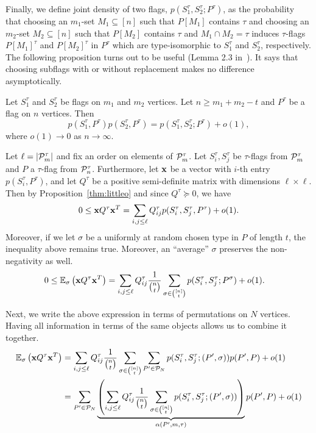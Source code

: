 Finally, we define joint density of two flags, $p(S_1^{\tau}, S_2^{\tau}; P^{\tau})$, as the probability that choosing an $m_1$-set $M_1 \subseteq [n]$ such that $P[M_1]$ contains $\tau$ and choosing an $m_2$-set $M_2 \subseteq [n]$ such that $P[M_2]$ contains $\tau$ and $M_1 \cap M_2 = \tau$ induces $\tau$-flags $P[M_1]^{\tau}$ and $P[M_2]^{\tau}$ in $P^\tau$ which are type-isomorphic to $S_1^{\tau}$ and $S_2^{\tau}$, respectively. The following proposition turns out to be useful (Lemma 2.3 in~\cite{razborov2007original}). It says that choosing subflags with or without replacement makes no difference asymptotically.

\begin{proposition}
Let $S_1^{\tau}$ and $S_2^{\tau}$ be flags on $m_1$ and $m_2$ vertices. Let $n \geq m_1 + m_2 - t$ and $P^{\tau}$ be a flag on $n$ vertices. Then
$$p(S_1^{\tau},P^{\tau})p(S_2^{\tau},P^{\tau}) = p(S_1^{\tau},S_2^{\tau}; P^{\tau}) + o(1),$$
where $o(1) \to 0$ as $n \to \infty$.
\label{thm:littleo}
\end{proposition}

Let $\ell = |\P_m^\tau|$ and fix an order on elements of $\P_m^\tau$. Let $S^\tau_i,S^\tau_j$ be $\tau$-flags from $\P_m^\tau$ and $P$ a $\tau$-flag from $\P_n^\tau$. Furthermore, let $\x$ be a vector with $i$-th entry $p(S_i^{\tau}, P^{\tau})$, and let $Q^\tau$ be a positive semi-definite matrix with dimensions $\ell \times \ell$. Then by Proposition~\ref{thm:littleo} and since $Q^\tau \succeq 0$, we have
$$ 0 \leq \x Q^\tau \x^T = \sum_{i,j \leq \ell} Q^\tau_{ij}p(S_i^{\tau},S_j^{\tau},P^{\tau}) + o(1).$$
Moreover, if we let $\sigma$ be a uniformly at random chosen type in $P$ of length $t$, the inequality above remains true. Moreover, an ``average'' $\sigma$ preserves the non-negativity as well. 
\begin{align}
0 \leq \mathbb{E}_{\sigma}\left(\x Q^\tau \x^T\right) &= \sum_{i,j \leq \ell}Q^\tau_{ij}\frac{1}{\binom{n}{t}}\sum_{\sigma \in \binom{[n]}{t}} p(S_i^{\tau}, S_j^{\tau}; P^{\sigma}) + o(1). \label{eq:fcoeffs}
\end{align}

Next, we write the above expression in terms of permutations on $N$ vertices. Having all information in terms of the same objects allows us to combine it together.  
\begin{align*}
\mathbb{E}_{\sigma}\left(\x Q^\tau \x^T\right) &= \sum_{i,j \leq \ell} Q^\tau_{ij} \frac{1}{\binom{n}{t}}\sum_{\sigma \in \binom{[n]}{t}} \sum_{P' \in \P_N}p(S_i^{\tau}, S_j^{\tau}; (P',\sigma)) p(P',P) + o(1)\\
&=  \sum_{P' \in \P_N}\underbrace{\left(\sum_{i,j \leq \ell} Q^\tau_{ij}\frac{1}{\binom{n}{t}}\sum_{\sigma \in \binom{[n]}{t}}p(S_i^{\tau}, S_j^{\tau}; (P',{\sigma})) \right)}_{\alpha(P', m,\tau)} p(P',P) + o(1)
\end{align*}

